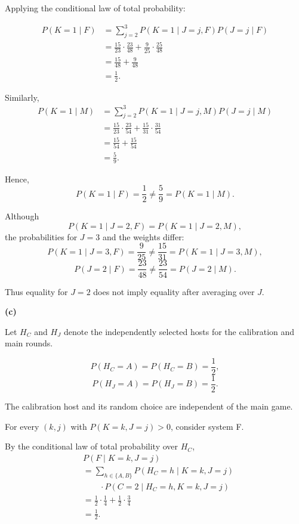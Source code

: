 \documentclass[11pt,a4paper]{article}
\newcommand{\Prob}{P}
\begin{document}
Applying the conditional law of total probability:

\[
\begin{aligned}
\Prob(K=1\mid F)
&=\sum_{j=2}^{3}
\Prob(K=1\mid J=j,F)\Prob(J=j\mid F)\\
&=\frac{15}{23}\cdot\frac{23}{48}
+\frac9{25}\cdot\frac{25}{48}\\
&=\frac{15}{48}+\frac9{48}\\
&=\frac12.
\end{aligned}
\]

Similarly,
\[
\begin{aligned}
\Prob(K=1\mid M)
&=\sum_{j=2}^{3}
\Prob(K=1\mid J=j,M)\Prob(J=j\mid M)\\
&=\frac{15}{23}\cdot\frac{23}{54}
+\frac{15}{31}\cdot\frac{31}{54}\\
&=\frac{15}{54}+\frac{15}{54}\\
&=\frac59.
\end{aligned}
\]

Hence,
\[
\Prob(K=1\mid F)=\frac12
\neq
\frac59=\Prob(K=1\mid M).
\]

Although
\[
\Prob(K=1\mid J=2,F)
=
\Prob(K=1\mid J=2,M),
\]
the probabilities for $J=3$ and the weights differ:
\[
\Prob(K=1\mid J=3,F)=\frac9{25}
\neq
\frac{15}{31}
=\Prob(K=1\mid J=3,M),
\]
\[
\Prob(J=2\mid F)=\frac{23}{48}
\neq
\frac{23}{54}=\Prob(J=2\mid M).
\]

Thus equality for $J=2$ does not imply equality after
averaging over $J$.

\medskip
\noindent\textbf{(c)}

Let $H_C$ and $H_J$ denote the independently selected hosts
for the calibration and main rounds.

\[
\Prob(H_C=A)=\Prob(H_C=B)=\frac12,
\]
\[
\Prob(H_J=A)=\Prob(H_J=B)=\frac12.
\]

The calibration host and its random choice are independent of
the main game.

For every $(k,j)$ with $\Prob(K=k,J=j)>0$, consider system F.

By the conditional law of total probability over $H_C$,
\[
\begin{aligned}
&\Prob(F\mid K=k,J=j)\\
&=\sum_{h\in\{A,B\}}
\Prob(H_C=h\mid K=k,J=j)\\
&\qquad\cdot
\Prob(C=2\mid H_C=h,K=k,J=j)\\
&=\frac12\cdot\frac14+
\frac12\cdot\frac34\\
&=\frac12.
\end{aligned}
\]
\end{document}
